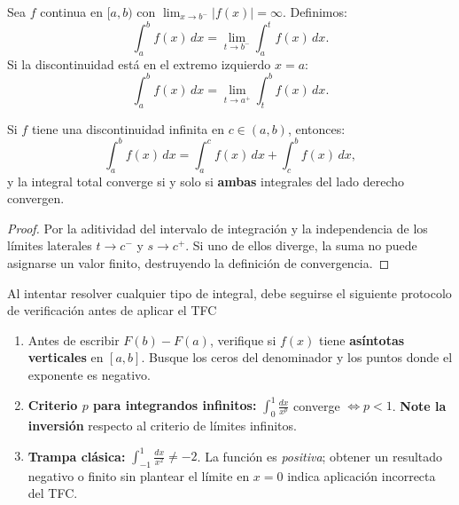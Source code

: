\begin{definition}
Sea $f$ continua en $[a,b)$ con $\lim_{x\to b^-}|f(x)|=\infty$. Definimos:
\[
  \int_{a}^{b} f(x)\,dx = \lim_{t\to b^-}\int_{a}^{t} f(x)\,dx.
\]
Si la discontinuidad está en el extremo izquierdo $x=a$:
\[
  \int_{a}^{b} f(x)\,dx = \lim_{t\to a^+}\int_{t}^{b} f(x)\,dx.
\]
\end{definition}

\begin{theorem}
Si $f$ tiene una discontinuidad infinita en $c\in(a,b)$, entonces:
\[
  \int_{a}^{b} f(x)\,dx = \int_{a}^{c} f(x)\,dx + \int_{c}^{b} f(x)\,dx,
\]
y la integral total converge si y solo si \textbf{ambas} integrales del lado derecho convergen.
\begin{proof}
Por la aditividad del intervalo de integración y la independencia de los límites laterales
$t\to c^-$ y $s\to c^+$. Si uno de ellos diverge, la suma no puede asignarse un valor finito,
destruyendo la definición de convergencia.
\end{proof}
\end{theorem}

\begin{rem} Al intentar resolver cualquier tipo de integral, debe seguirse el siguiente protocolo de verificación antes de aplicar el TFC
\begin{enumerate}
    \item  Antes de escribir $F(b)-F(a)$, verifique si $f(x)$ tiene
          \textbf{asíntotas verticales} en $[a,b]$. Busque los ceros del denominador y los puntos
          donde el exponente es negativo.
    \item \textbf{Criterio $p$ para integrandos infinitos:}
          $\displaystyle\int_0^1\frac{dx}{x^p}$ converge $\iff p<1$.
          \textbf{Note la inversión} respecto al criterio de límites infinitos.
    \item \textbf{Trampa clásica:}
          $\displaystyle\int_{-1}^{1}\frac{dx}{x^2}\neq -2$.
          La función es \emph{positiva}; obtener un resultado negativo o finito sin plantear el
          límite en $x=0$ indica aplicación incorrecta del TFC.
\end{enumerate}
\end{rem}


